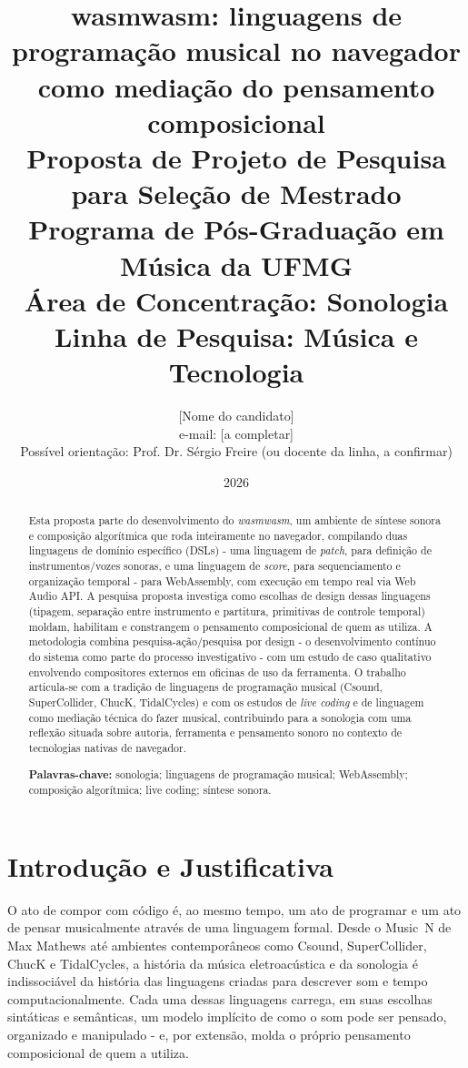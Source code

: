 \documentclass[12pt,a4paper]{article}
\title{\textbf{wasmwasm: linguagens de programação musical no navegador \\
como mediação do pensamento composicional} \\[0.3cm]
\large Proposta de Projeto de Pesquisa para Seleção de Mestrado \\
Programa de Pós-Graduação em Música da UFMG \\
Área de Concentração: Sonologia \\
Linha de Pesquisa: Música e Tecnologia}
\author{[Nome do candidato] \\ \small e-mail: [a completar] \\ \small Possível orientação: Prof. Dr. Sérgio Freire (ou docente da linha, a confirmar)}
\date{2026}
\begin{document}
\maketitle

\begin{abstract}
\noindent Esta proposta parte do desenvolvimento do \emph{wasmwasm}, um ambiente de síntese sonora e composição algorítmica que roda inteiramente no navegador, compilando duas linguagens de domínio específico (DSLs) - uma linguagem de \emph{patch}, para definição de instrumentos/vozes sonoras, e uma linguagem de \emph{score}, para sequenciamento e organização temporal - para WebAssembly, com execução em tempo real via Web Audio API. A pesquisa proposta investiga como escolhas de design dessas linguagens (tipagem, separação entre instrumento e partitura, primitivas de controle temporal) moldam, habilitam e constrangem o pensamento composicional de quem as utiliza. A metodologia combina pesquisa-ação/pesquisa por design - o desenvolvimento contínuo do sistema como parte do processo investigativo - com um estudo de caso qualitativo envolvendo compositores externos em oficinas de uso da ferramenta. O trabalho articula-se com a tradição de linguagens de programação musical (Csound, SuperCollider, ChucK, TidalCycles) e com os estudos de \emph{live coding} e de linguagem como mediação técnica do fazer musical, contribuindo para a sonologia com uma reflexão situada sobre autoria, ferramenta e pensamento sonoro no contexto de tecnologias nativas de navegador.

\vspace{0.3cm}
\noindent \textbf{Palavras-chave:} sonologia; linguagens de programação musical; WebAssembly; composição algorítmica; live coding; síntese sonora.
\end{abstract}

\section{Introdução e Justificativa}

O ato de compor com código é, ao mesmo tempo, um ato de programar e um ato de pensar musicalmente através de uma linguagem formal. Desde o Music~N de Max Mathews até ambientes contemporâneos como Csound, SuperCollider, ChucK e TidalCycles, a história da música eletroacústica e da sonologia é indissociável da história das linguagens criadas para descrever som e tempo computacionalmente. Cada uma dessas linguagens carrega, em suas escolhas sintáticas e semânticas, um modelo implícito de como o som pode ser pensado, organizado e manipulado - e, por extensão, molda o próprio pensamento composicional de quem a utiliza.
\end{document}
